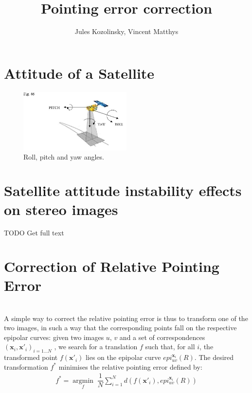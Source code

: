 \documentclass[paper=a4, fontsize=11pt]{article}
\title{\normalfont \normalsize 
\huge Pointing error correction}
\author{Jules Kozolinsky, Vincent Matthys}
\date{}
\newcommand{\argmin}[1]{\underset{#1}{\operatorname{argmin}}\;}
\begin{document}
\maketitle

\section{Attitude of a Satellite}

\begin{figure}[h]
	\centering
	\includegraphics[width=0.5\textwidth]{figures/angles.jpg}
   \caption{ Roll, pitch and yaw angles.}
   \label{angles}
\end{figure}

\section{Satellite attitude instability effects on stereo images}
\label{sec:sensibility}
\cite{1326585}
TODO Get full text

\section{Correction of Relative Pointing Error}
\cite{de2014automatic}\\

A simple way to correct the relative pointing error is thus to transform one of the two images, in such a way that the corresponding points fall on the respective epipolar curves: given two images $u$, $v$ and a set of correspondences $(\textbf{x}_i , \textbf{x}'_i)_{i=1...N}$ , we search for a translation $f$ such that, for all $i$, the transformed point $f(\textbf{x}'_i)$ lies on the epipolar curve $epi^{\textbf{x}_i}_{u v}(R)$.
The desired transformation $f^{*}$ minimises the relative pointing error defined by:
\begin{align}
\label{minif}
f^* = \argmin{f} \dfrac{1}{N} \sum\limits_{i=1}^{N} d(f(\textbf{x}'_i), epi^{\textbf{x}_i}_{u v}(R))
\end{align}
\end{document}
